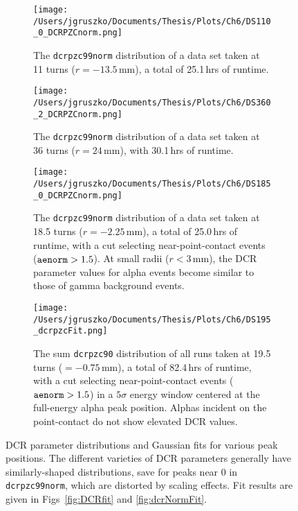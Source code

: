 \begin{figure*}[]
 \centering
  \begin{subfigure}[t]{.45\textwidth}
 \texttt{[image: /Users/jgruszko/Documents/Thesis/Plots/Ch6/DS110\_0\_DCRPZCnorm.png]}
  \caption{The {\tt dcrpzc99norm} distribution of a data set taken at 11 turns ($r= -13.5$\,mm), a total of 25.1\,hrs of runtime.}
 \label{fig:DCRfit_110}
\end{subfigure}
\hfill
  \begin{subfigure}[t]{.45\textwidth}
 \texttt{[image: /Users/jgruszko/Documents/Thesis/Plots/Ch6/DS360\_2\_DCRPZCnorm.png]}
  \caption{The {\tt dcrpzc99norm} distribution of a data set taken at 36 turns ($r = 24$\,mm), with 30.1\,hrs of runtime.}
 \label{fig:DCRfit_360}
\end{subfigure}
\hfill
 \begin{subfigure}[t]{.45\textwidth}
 \texttt{[image: /Users/jgruszko/Documents/Thesis/Plots/Ch6/DS185\_0\_DCRPZCnorm.png]}
  \caption{The {\tt dcrpzc99norm} distribution of a data set taken at 18.5 turns ($r = -2.25$\,mm), a total of 25.0\,hrs of runtime, with a cut selecting near-point-contact events (${\tt aenorm} > 1.5$). At small radii ($r<3$\,mm), the DCR parameter values for alpha events become similar to those of gamma background events.}
 \label{fig:DCRfit_185}
\end{subfigure}
\hfill
 \begin{subfigure}[t]{.45\textwidth}
 \texttt{[image: /Users/jgruszko/Documents/Thesis/Plots/Ch6/DS195\_dcrpzcFit.png]}
 \caption{The sum {\tt dcrpzc90} distribution of all runs taken at 19.5 turns ($ = -0.75$\,mm), a total of 82.4\,hrs of runtime, with a cut selecting near-point-contact events (${\tt aenorm} > 1.5$) in a $5\sigma$ energy window centered at the full-energy alpha peak position. Alphas incident on the point-contact do not show elevated DCR values.}
 \label{fig:DS195_dcrFit}
\end{subfigure}
 \caption[DCR parameter distributions and Gaussian fits for various peak positions]{DCR parameter distributions and Gaussian fits for various peak positions. The different varieties of DCR parameters generally have similarly-shaped distributions, save for peaks near 0 in {\tt dcrpzc99norm}, which are distorted by scaling effects. Fit results are given in Figs~\ref{fig:DCRfit} and \ref{fig:dcrNormFit}.} 
 \label{fig:DCRpeaks}
\end{figure*}

